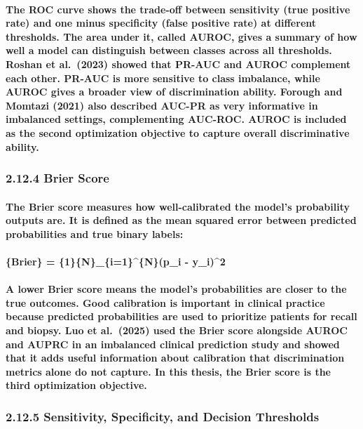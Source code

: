 \paragraph{The ROC curve shows the trade-off between sensitivity (true positive rate) and one minus specificity (false positive rate) at different thresholds. The area under it, called AUROC, gives a summary of how well a model can distinguish between classes across all thresholds. Roshan et al. (2023) showed that PR-AUC and AUROC complement each other. PR-AUC is more sensitive to class imbalance, while AUROC gives a broader view of discrimination ability. Forough and Momtazi (2021) also described AUC-PR as very informative in imbalanced settings, complementing AUC-ROC. AUROC is included as the second optimization objective to capture overall discriminative ability.}

\subsubsection{2.12.4 Brier Score}\label{brier-score}

\paragraph{The Brier score measures how well-calibrated the model’s probability outputs are. It is defined as the mean squared error between predicted probabilities and true binary labels:}

\paragraph{\text\{Brier\} = \frac\{1\}\{N\}\sum\_\{i=1\}^\{N\}(p\_i - y\_i)^2}

\paragraph{A lower Brier score means the model’s probabilities are closer to the true outcomes. Good calibration is important in clinical practice because predicted probabilities are used to prioritize patients for recall and biopsy. Luo et al. (2025) used the Brier score alongside AUROC and AUPRC in an imbalanced clinical prediction study and showed that it adds useful information about calibration that discrimination metrics alone do not capture. In this thesis, the Brier score is the third optimization objective.}

\subsubsection{2.12.5 Sensitivity, Specificity, and Decision
Thresholds}\label{sensitivity-specificity-and-decision-thresholds}

